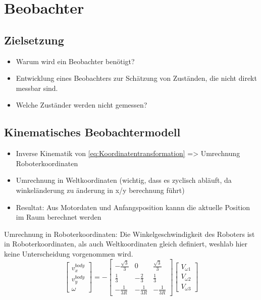 \chapter{Beobachter}
\section{Zielsetzung}
\begin{itemize}
    \item Warum wird ein Beobachter benötigt?
    \item Entwicklung eines Beobachters zur Schätzung von Zuständen, die nicht direkt messbar sind.
    \item Welche Zuständer werden nicht gemessen?
\end{itemize}

\section{Kinematisches Beobachtermodell}
\begin{itemize}
    \item Inverse Kinematik von \ref{eq:Koordinatentransformation} => Umrechnung Roboterkoordinaten
    \item Umrechnung in Weltkoordinaten (wichtig, dass es zyclisch abläuft, da winkeländerung zu änderung in x/y berechnung führt)
    \item Resultat: Aus Motordaten und Anfangsposition kannn die aktuelle Position im Raum berechnet werden
\end{itemize}
Umrechnung in Roboterkoordinaten:
Die Winkelgeschwindigkeit des Roboters ist in Roboterkoordinaten, als auch Weltkoordinaten gleich definiert, weshlab hier keine Unterscheidung vorgenommen wird.
\begin{equation}
    \begin{bmatrix}
        v_x^{body} \\
        v_y^{body} \\
        \omega
    \end{bmatrix}
    =
    -
    \begin{bmatrix}
        -\frac{\sqrt{3}}{3} & 0 & \frac{\sqrt{3}}{3} \\
		\frac{1}{3} & -\frac{2}{3} & \frac{1}{3} \\
		-\frac{1}{3R} & -\frac{1}{3R} & -\frac{1}{3R}
    \end{bmatrix}
    \begin{bmatrix}
        V_{\omega1} \\
        V_{\omega2} \\
        V_{\omega3}
    \end{bmatrix}
\end{equation}
